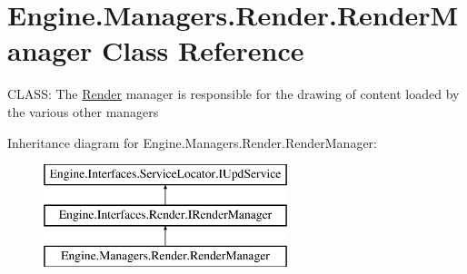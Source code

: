 \hypertarget{a00526}{}\section{Engine.\+Managers.\+Render.\+Render\+Manager Class Reference}
\label{a00526}


C\+L\+A\+SS\+: The \hyperlink{a00271}{Render} manager is responsible for the drawing of content loaded by the various other managers  


Inheritance diagram for Engine.\+Managers.\+Render.\+Render\+Manager\+:\begin{figure}[H]
\begin{center}
\leavevmode
\includegraphics[height=3.000000cm]{d0/d35/a00526}
\end{center}
\end{figure}
